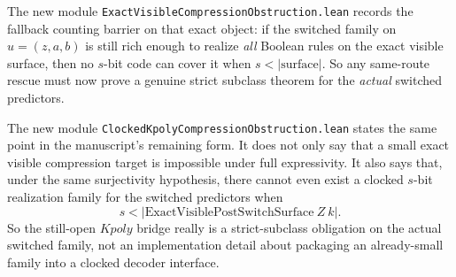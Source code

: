 \documentclass[11pt]{article}
\theoremstyle{remark}
\begin{document}
The new module \texttt{ExactVisibleCompressionObstruction.lean} records the
fallback counting barrier on that exact object: if the switched family on
\(u=(z,a,b)\) is still rich enough to realize \emph{all} Boolean rules on the
exact visible surface, then no \(s\)-bit code can cover it when
\(s < |\text{surface}|\).  So any same-route rescue must now prove a genuine
strict subclass theorem for the \emph{actual} switched predictors.

The new module \texttt{ClockedKpolyCompressionObstruction.lean} states the same
point in the manuscript's remaining form.  It does not only say that a small
exact visible compression target is impossible under full expressivity.  It
also says that, under the same surjectivity hypothesis, there cannot even
exist a clocked \(s\)-bit realization family for the switched predictors when
\[
  s < |\text{ExactVisiblePostSwitchSurface}\ Z\ k|.
\]
So the still-open \(Kpoly\) bridge really is a strict-subclass obligation on
the actual switched family, not an implementation detail about packaging an
already-small family into a clocked decoder interface.
\end{document}
